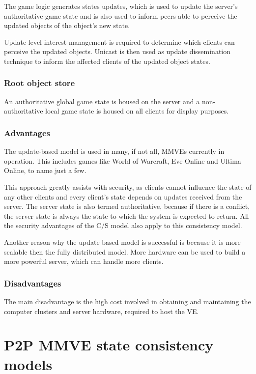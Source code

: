 The game logic generates states updates, which is used to update the server's authoritative game state and is also used to inform peers able to perceive the updated objects of the object's new state.

Update level interest management is required to determine which clients can perceive the updated objects. Unicast is then used as update dissemination technique to inform the affected clients of the updated object states.

\subsubsection{Root object store}
An authoritative global game state is housed on the server and a  non-authoritative local game state is housed on all clients for display purposes.

\subsubsection{Advantages}
The update-based model is used in many, if not all, MMVEs currently in operation. This includes games like World of Warcraft, Eve Online and Ultima Online, to name just a few.

This approach greatly assists with security, as clients cannot influence the state of any other clients and every client's state depends on updates
received from the server. The server state is also termed authoritative, because if there is a conflict, the server state is always the state to
which the system is expected to return. All the security advantages of the C/S model also apply to this consistency model.

Another reason why the update based model is successful is because it is more scalable then the fully distributed model. More hardware can be used to build a more powerful server, which can handle more clients.

\subsubsection{Disadvantages}

The main disadvantage is the high cost involved in obtaining and maintaining the computer clusters and server hardware, required to host the VE.

\section{P2P MMVE state consistency models}
\label{p2p_mmve_state_consistency}

